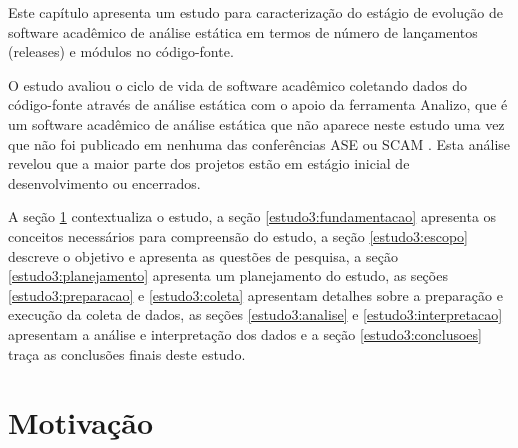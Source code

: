 \label{estudo3}

Este capítulo apresenta um estudo para caracterização do estágio de evolução de
software acadêmico de análise estática em termos de número de lançamentos
(releases) e módulos no código-fonte.

O estudo avaliou o ciclo de vida de software acadêmico coletando
dados do código-fonte através de análise estática com o apoio da
ferramenta Analizo, que é um software acadêmico de análise estática que não
aparece neste estudo uma vez que não foi publicado em nenhuma das
conferências ASE ou SCAM \cite{terceiro2010analizo}.
Esta análise revelou que a maior parte dos projetos
estão em estágio inicial de desenvolvimento ou encerrados.

A seção \ref{estudo3:introducao} contextualiza o estudo,
a seção \ref{estudo3:fundamentacao} apresenta os conceitos necessários para compreensão do estudo,
a seção \ref{estudo3:escopo} descreve o objetivo e apresenta as questões de pesquisa,
a seção \ref{estudo3:planejamento} apresenta um planejamento do estudo,
as seções \ref{estudo3:preparacao} e \ref{estudo3:coleta} apresentam detalhes sobre a preparação e execução da coleta de dados,
as seções \ref{estudo3:analise} e \ref{estudo3:interpretacao} apresentam a análise e interpretação dos dados e
a seção \ref{estudo3:conclusoes} traça as conclusões finais deste estudo.

\section{Motivação} \label{estudo3:introducao} %



